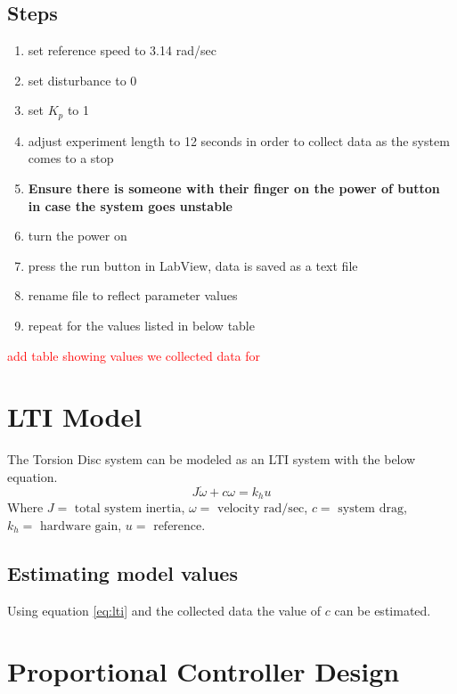 \documentclass[11pt,titlepage]{article}
\begin{document}
	\subsection*{Steps}
		\begin{enumerate}
			\item set reference speed to 3.14 rad/sec
			\item set disturbance to 0
			\item set $K_p$ to 1
			\item adjust experiment length to 12 seconds in order to collect data as the system comes to a stop
			\item \textbf{Ensure there is someone with their finger on the power of button in case the system goes unstable}
			\item turn the power on
			\item press the run button in LabView, data is saved as a text file
			\item rename file to reflect parameter values
			\item repeat for the values listed in below table
		\end{enumerate}
		\textcolor{red}{add table showing values we collected data for}

\section{LTI Model}
	The Torsion Disc system can be modeled as an LTI system with the below equation.
	\begin{equation} \label{eq:lti}
		J\dot{\omega}+c\omega=k_hu
	\end{equation}
	Where $J=\mbox{ total system inertia}$, $\omega=\mbox{ velocity rad/sec}$, $c=\mbox{ system drag}$, $k_h=\mbox{ hardware gain}$, $u=\mbox{ reference}$.

	\subsection{Estimating model values}
	Using equation \ref{eq:lti} and the collected data the value of $c$ can be estimated.

\section{Proportional Controller Design}
\end{document}
